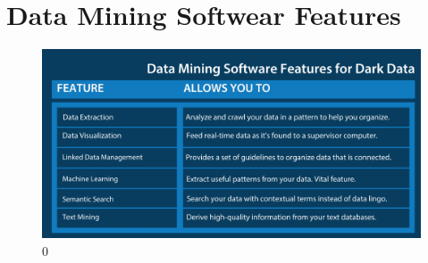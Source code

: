 \documentclass{article}
\begin{document}
\section{Data Mining Softwear Features}
\begin{figure}[H]
\centering
\includegraphics[height=3.35in•]{Data_Mining_Features (1).png}
\caption{0}

\end{figure}


\newpage
\end{document}
